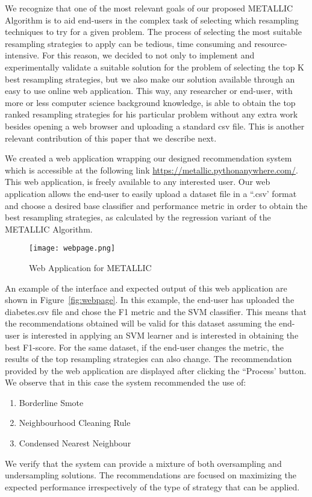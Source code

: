 \documentclass{article}
\begin{document}
We recognize that one of the most relevant goals of our proposed METALLIC Algorithm is to aid end-users in the complex task of selecting which resampling techniques to try for a given problem. The process of selecting the most suitable resampling strategies to apply can be tedious, time consuming and resource-intensive. For this reason, we decided to not only to implement and experimentally validate a suitable solution for the problem of selecting the top K best resampling strategies, but we also make our solution available through an easy to use online web application. This way, any researcher or end-user, with more or less computer science background knowledge, is able to obtain the top ranked resampling strategies for his particular problem without any extra work besides opening a web browser and uploading a standard csv file. This is another relevant contribution of this paper that we describe next.


We created a web application wrapping our designed recommendation system which is accessible at the following link \url{https://metallic.pythonanywhere.com/}. This web application, is freely available to any interested user. Our web application allows the end-user to easily upload a dataset file in a ``.csv' format and choose a desired base classifier and performance metric in order to obtain the best resampling strategies, as calculated by the regression variant of the METALLIC Algorithm. 


\begin{figure}[htpb]
    \centering
    \texttt{[image: webpage.png]}
    \caption{Web Application for METALLIC}\label{fig:webpage}
\end{figure}


An example of the interface and expected output of this web application are shown in Figure~\autoref{fig:webpage}. In this example, the end-user has uploaded the diabetes.csv file and chose the F1 metric and the SVM classifier. This means that the recommendations obtained will be valid for this dataset assuming the end-user is interested in applying an SVM learner and is interested in obtaining the best F1-score. For the same dataset, if the end-user changes the metric, the results of the top resampling strategies can also change. The recommendation provided by the web application are displayed after clicking the ``Process' button. We observe that in this case the system recommended the use of:
\begin{enumerate}
    \item Borderline Smote
    \item Neighbourhood Cleaning Rule
    \item Condensed Nearest Neighbour
\end{enumerate}
We verify that the system can provide a mixture of both oversampling and undersampling solutions. The recommendations are focused on maximizing the expected performance irrespectively of the type of strategy that can be applied.
\end{document}
